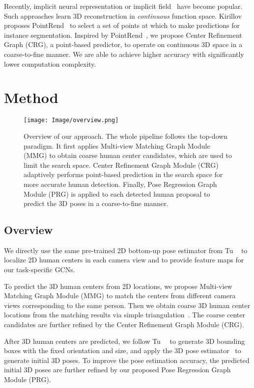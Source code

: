 \documentclass[10pt,twocolumn,letterpaper]{article}
\begin{document}
Recently, implicit neural representation or implicit field~\cite{chen2019learning,mescheder2019occupancy,saito2019pifu,saito2020pifuhd} have become popular. Such approaches learn 3D reconstruction in \emph{continuous} function space. Kirillov \etal proposes PointRend~\cite{kirillov2020pointrend} to select a set of points at which to make predictions for instance segmentation. Inspired by PointRend~\cite{kirillov2020pointrend}, we propose Center Refinement Graph (CRG), a point-based predictor, to operate on continuous 3D space in a coarse-to-fine manner. We are able to achieve higher accuracy with significantly lower computation complexity. 

\section{Method}

\begin{figure*}[t]
	\centering
	\texttt{[image: Image/overview.png]}
	\caption{Overview of our approach. The whole pipeline follows the top-down paradigm. It first applies Multi-view Matching Graph Module (MMG) to obtain coarse human center candidates, which are used to limit the search space. Center Refinement Graph Module (CRG) adaptively performs point-based prediction in the search space for more accurate human detection. Finally, Pose Regression Graph Module (PRG) is applied to each detected human proposal to predict the 3D poses in a coarse-to-fine manner.}
	\label{fig:pipeline}
\end{figure*}

\subsection{Overview}

We directly use the same pre-trained 2D bottom-up pose estimator from Tu \etal~\cite{tu2020voxelpose} to localize 2D human centers in each camera view and to provide feature maps for our task-specific GCNs.

To predict the 3D human centers from 2D locations, we propose Multi-view Matching Graph Module (MMG) to match the centers from different camera views corresponding to the same person. Then we obtain coarse 3D human center locations from the matching results via simple triangulation~\cite{andrew2001multiple}. The coarse center candidates are further refined by the Center Refinement Graph Module (CRG).

After 3D human centers are predicted, we follow Tu~\etal~\cite{tu2020voxelpose} to generate 3D bounding boxes with the fixed orientation and size, and apply the 3D pose estimator~\cite{tu2020voxelpose} to generate initial 3D poses. To improve the pose estimation accuracy, the predicted initial 3D poses are further refined by our proposed Pose Regression Graph Module (PRG). 
\end{document}
